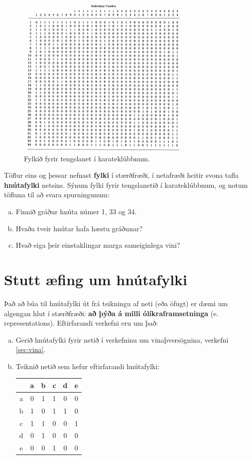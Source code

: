 \documentclass[b5paper,12pt]{book}
\begin{document}
\begin{figure}[h]
  \includegraphics[width=0.75\textwidth, center]{Myndir/Karatetafla.png}
  \caption*{Fylkið fyrir tengslanet í karateklúbbnum.}
\end{figure}

Töflur eins og þessar nefnast \textbf{fylki} í stærðfræði, í netafræði heitir svona tafla \textbf{hnútafylki} netsins. Sýnum fylki fyrir tengslanetið í karateklúbbnum, og notum töfluna til að svara spurningunum:
\begin{enumerate}[(a)]
    \item Finnið gráður hnúta númer 1, 33 og 34. 
    \item Hvaða tveir hnútar hafa hæstu gráðunar?
    \item Hvað eiga þeir einstaklingar marga sameiginlega vini?
\end{enumerate}

\section{Stutt æfing um hnútafylki}
Það að búa til hnútafylki út frá teikningu af neti (eða öfugt) er dæmi um algengan hlut í stærðfræði: \textbf{að þýða á milli ólíkraframsetninga} (e. representations). Eftirfarandi verkefni eru um það: 
\begin{enumerate}[(a)]
    \item Gerið hnútafylki fyrir netið í verkefninu um vinaþversögnina, verkefni \ref{sec:vina}.
    \item Teiknið netið sem hefur eftirfarandi hnútafylki:

\begin{tabular}{ c | c c c c c } 
      & a & b & c & d & e \\
    \hline
    a & 0 & 1 & 1 & 0 & 0 \\
    b & 1 & 0 & 1 & 1 & 0 \\
    c & 1 & 1 & 0 & 0 & 1 \\
    d & 0 & 1 & 0 & 0 & 0 \\
    e & 0 & 0 & 1 & 0 & 0 
\end{tabular}
\end{enumerate}
\end{document}
